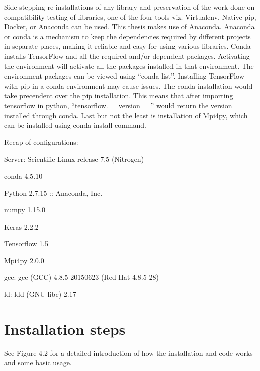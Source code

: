 Side-stepping re-installations of any library and preservation of the work done on compatibility testing of libraries, one of the four tools viz. Virtualenv, Native pip, Docker, or Anaconda can be used. This thesis makes use of Anaconda. Anaconda or conda is a mechanism to keep the dependencies required by different projects in separate places, making it reliable and easy for using various libraries. Conda installs TensorFlow and all the required and/or dependent packages. Activating the environment will activate all the packages installed in that environment. The environment packages can be viewed using “conda list”. 
Installing TensorFlow with pip in a conda environment may cause issues. The conda installation would take precendent over the pip installation. This means that after importing tensorflow in python, “tensorflow.{\_}{\_}version{\_}{\_}” would return the version installed through conda.
Last but not the least is installation of Mpi4py, which can be installed using conda install command.



Recap of configurations:


\setlength\parindent{24pt} Server: Scientific Linux release 7.5 (Nitrogen)

\setlength\parindent{24pt} conda 4.5.10

\setlength\parindent{24pt} Python 2.7.15 :: Anaconda, Inc.

\setlength\parindent{24pt} numpy 1.15.0

\setlength\parindent{24pt} Keras 2.2.2

\setlength\parindent{24pt} Tensorflow 1.5

\setlength\parindent{24pt} Mpi4py 2.0.0

\setlength\parindent{24pt} gcc: gcc (GCC) 4.8.5 20150623 (Red Hat 4.8.5-28)

\setlength\parindent{24pt} ld: ldd (GNU libc) 2.17


\section{Installation steps}

See Figure 4.2 for a detailed introduction of how the installation and code works and some basic usage.

